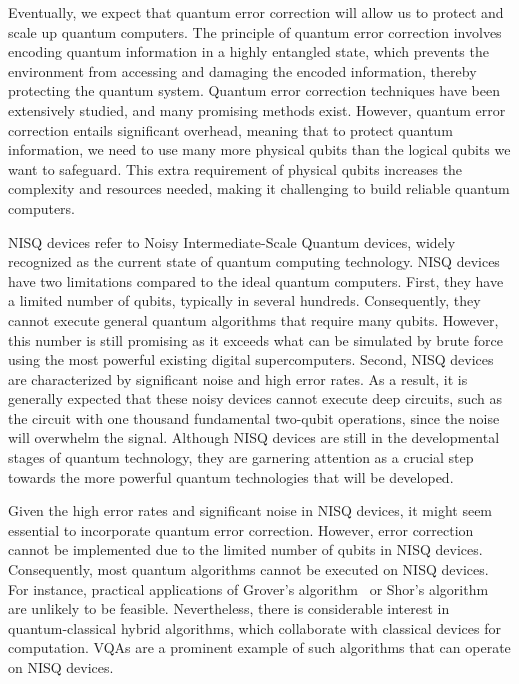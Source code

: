 \documentclass[12pt,dvipdfmx,twoside,openright]{report}
\begin{document}
Eventually, we expect that quantum error correction will allow us to protect and scale up quantum computers.
The principle of quantum error correction involves encoding quantum information in a highly entangled state, which prevents the environment from accessing and damaging the encoded information, thereby protecting the quantum system.
Quantum error correction techniques have been extensively studied, and many promising methods exist.
However, quantum error correction entails significant overhead, meaning that to protect quantum information, we need to use many more physical qubits than the logical qubits we want to safeguard.
This extra requirement of physical qubits increases the complexity and resources needed, making it challenging to build reliable quantum computers.

NISQ devices refer to Noisy Intermediate-Scale Quantum devices, widely recognized as the current state of quantum computing technology.
NISQ devices have two limitations compared to the ideal quantum computers.
First, they have a limited number of qubits, typically in several hundreds.
Consequently, they cannot execute general quantum algorithms that require many qubits.
However, this number is still promising as it exceeds what can be simulated by brute force using the most powerful existing digital supercomputers.
Second, NISQ devices are characterized by significant noise and high error rates.
As a result, it is generally expected that these noisy devices cannot execute deep circuits, such as the circuit with one thousand fundamental two-qubit operations, since the noise will overwhelm the signal.
Although NISQ devices are still in the developmental stages of quantum technology, they are garnering attention as a crucial step towards the more powerful quantum technologies that will be developed.

Given the high error rates and significant noise in NISQ devices, it might seem essential to incorporate quantum error correction. 
However, error correction cannot be implemented due to the limited number of qubits in NISQ devices.
Consequently, most quantum algorithms cannot be executed on NISQ devices. 
For instance, practical applications of Grover's algorithm~\cite{grover1996fast} or Shor's algorithm~\cite{shor1994algorithms} are unlikely to be feasible. 
Nevertheless, there is considerable interest in quantum-classical hybrid algorithms, which collaborate with classical devices for computation. 
VQAs are a prominent example of such algorithms that can operate on NISQ devices.
\end{document}
